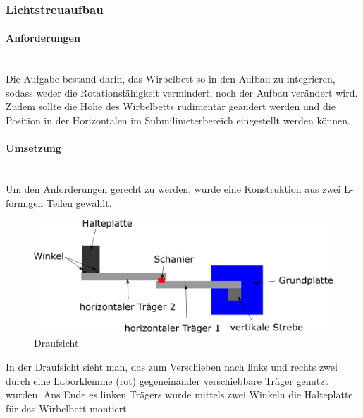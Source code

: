 \subsubsection{Lichtstreuaufbau}


\paragraph{Anforderungen}

\hfill \\
Die Aufgabe bestand darin, das Wirbelbett so in den Aufbau zu integrieren, sodass weder die Rotationsfähigkeit vermindert, noch der Aufbau verändert wird. Zudem sollte die Höhe des Wirbelbetts rudimentär geändert werden und die Position in der Horizontalen im Submilimeterbereich eingestellt werden können. 

\newpage

\paragraph{Umsetzung}
\hfill \\
Um den Anforderungen gerecht zu werden, wurde eine Konstruktion aus zwei L-förmigen Teilen gewählt. 

\begin{figure}[h]
		\centering
		\includegraphics[scale=0.9]{Halterung_Lichtstreu_Vogel.png}
		\caption[Haltearm Lichtstreuaufbau Draufsicht]{Draufsicht}
\end{figure}

In der Draufsicht sieht man, das zum Verschieben nach links und rechts zwei durch eine Laborklemme (rot) gegeneinander verschiebbare Träger genutzt wurden. Ans Ende es linken Trägers wurde mittels zwei Winkeln die Halteplatte für das Wirbelbett montiert.

